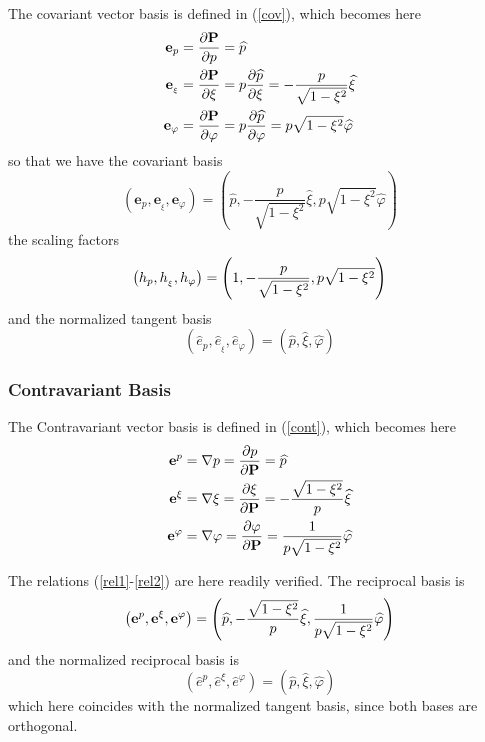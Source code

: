 The covariant vector basis is defined in (\ref{cov}), which becomes here 
\begin{align}
\mathbf{e}_{p} & =\frac{\partial\mathbf{P}}{\partial p}=\widehat{p} \\
\mathbf{e}_{_{\xi}} & =\frac{\partial\mathbf{P}}{\partial\xi}=p\frac {%
\partial\widehat{p}}{\partial\xi}=-\frac{p}{\sqrt{1-\xi^{2}}}\widehat{\xi} \\
\mathbf{e}_{\varphi} & =\frac{\partial\mathbf{P}}{\partial\varphi}=p\frac{%
\partial\widehat{p}}{\partial\varphi}=p\sqrt{1-\xi^{2}}\widehat {\varphi}
\end{align}
so that we have the covariant basis 
\begin{equation}
\left( \mathbf{e}_{p},\mathbf{e}_{_{\xi}},\mathbf{e}_{\varphi}\right)
=\left( \widehat{p},-\frac{p}{\sqrt{1-\xi^{2}}}\widehat{\xi},p\sqrt{1-\xi
^{2}}\widehat{\varphi}\right)
\end{equation}
the scaling factors 
\begin{equation}
\left( h_{p},h_{_{\xi}},h_{\varphi}\right) =\left( 1,-\frac{p}{\sqrt {%
1-\xi^{2}}},p\sqrt{1-\xi^{2}}\right)
\end{equation}
and the normalized tangent basis 
\begin{equation}
\left( \widehat{e}_{p},\widehat{e}_{_{\xi}},\widehat{e}_{\varphi}\right)
=\left( \widehat{p},\widehat{\xi},\widehat{\varphi}\right)
\end{equation}

\subsubsection{Contravariant Basis}

The Contravariant vector basis is defined in (\ref{cont}), which becomes
here 
\begin{align}
\mathbf{e}^{p} & =\nabla p=\frac{\partial p}{\partial\mathbf{P}}=\widehat {p}
\\
\mathbf{e}^{\xi} & =\nabla\xi=\frac{\partial\xi}{\partial\mathbf{P}}=-\frac{%
\sqrt{1-\xi^{2}}}{p}\widehat{\xi} \\
\mathbf{e}^{\varphi} & =\nabla\varphi=\frac{\partial\varphi}{\partial 
\mathbf{P}}=\frac{1}{p\sqrt{1-\xi^{2}}}\widehat{\varphi}
\end{align}

The relations (\ref{rel1}-\ref{rel2}) are here readily verified. The
reciprocal basis is 
\begin{equation}
\left( \mathbf{e}^{p},\mathbf{e}^{\xi},\mathbf{e}^{\varphi}\right) =\left( 
\widehat{ p},-\frac{\sqrt{1-\xi^{2}}}{p}\widehat{\xi},\frac{1}{p\sqrt {%
1-\xi^{2}}}\widehat{\varphi}\right)
\end{equation}
and the normalized reciprocal basis is 
\begin{equation}
\left( \widehat{e}^{p},\widehat{e}^{\xi},\widehat{e}^{\varphi}\right)
=\left( \widehat{p},\widehat{\xi},\widehat{\varphi}\right)
\end{equation}
which here coincides with the normalized tangent basis, since both bases are
orthogonal.

